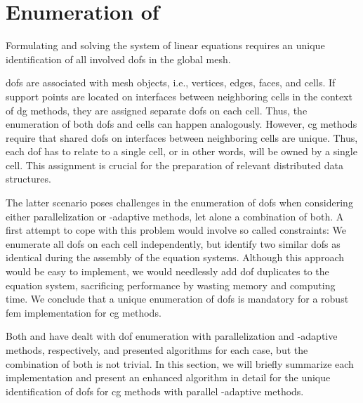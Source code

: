 \section{Enumeration of }
\label{sec:enumeration}

Formulating and solving the system of linear equations requires an unique identification of all involved \glspl{dof} in the global mesh.

\Glspl{dof} are associated with mesh objects, i.e., vertices, edges, faces, and cells. If support points are located on interfaces between neighboring cells in the context of \gls{dg} methods, they are assigned separate \glspl{dof} on each cell. Thus, the enumeration of both \glspl{dof} and cells can happen analogously. However, \gls{cg} methods require that shared \glspl{dof} on interfaces between neighboring cells are unique. Thus, each \gls{dof} has to relate to a single cell, or in other words, will be owned by a single cell. This assignment is crucial for the preparation of relevant distributed data structures.


The latter scenario poses challenges in the enumeration of \glspl{dof} when considering either parallelization or \hp-adaptive methods, let alone a combination of both. A first attempt to cope with this problem would involve so called constraints: We enumerate all \glspl{dof} on each cell independently, but identify two similar \glspl{dof} as identical during the assembly of the equation systems. Although this approach would be easy to implement, we would needlessly add \gls{dof} duplicates to the equation system, sacrificing performance by wasting memory and computing time. We conclude that a unique enumeration of \glspl{dof} is mandatory for a robust \gls{fem} implementation for \gls{cg} methods.

Both \textcite{bangerth2012} and \textcite{bangerth2009} have dealt with \gls{dof} enumeration with parallelization and \hp-adaptive methods, respectively, and presented algorithms for each case, but the combination of both is not trivial. In this section, we will briefly summarize each implementation and present an enhanced algorithm in detail for the unique identification of \glspl{dof} for \gls{cg} methods with parallel \hp-adaptive methods.

